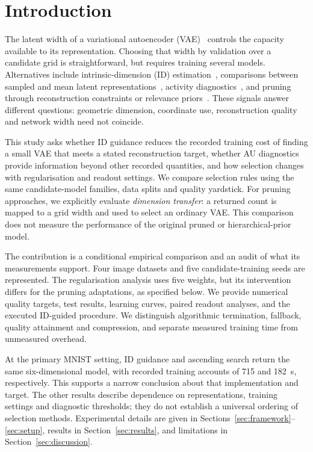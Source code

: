 \documentclass[make,article,submit,pdftex,moreauthors]{Definitions/mdpi}
\begin{document}
\section{Introduction}\label{sec:intro}

The latent width of a variational autoencoder (VAE)~\cite{kingma2014vae}
controls the capacity available to its representation. Choosing that width
by validation over a candidate grid is straightforward, but requires
training several models. Alternatives include intrinsic-dimension (ID)
estimation~\cite{facco2017twonn,levina2005mle}, comparisons between sampled
and mean latent representations~\cite{bonheme2022fondue}, activity
diagnostics~\cite{burda2016iwae,bonheme2023active}, and pruning through
reconstruction constraints or relevance priors~\cite{deboom2020geco,saha2025ardvae}.
These signals answer different questions: geometric dimension, coordinate
use, reconstruction quality and network width need not coincide.

This study asks whether ID guidance reduces the recorded training cost of
finding a small VAE that meets a stated reconstruction target, whether AU
diagnostics provide information beyond other recorded quantities, and how
selection changes with regularisation and readout settings. We compare
selection rules using the same candidate-model families, data splits and
quality yardstick. For pruning approaches, we explicitly evaluate
\emph{dimension transfer}: a returned count is mapped to a grid width and
used to select an ordinary VAE. This comparison does not measure the
performance of the original pruned or hierarchical-prior model.

The contribution is a conditional empirical comparison and an audit of
what its measurements support. Four image datasets and five
candidate-training seeds are represented. The regularisation analysis
uses five weights, but its intervention differs for the pruning
adaptations, as specified below. We provide numerical quality targets,
test results, learning curves, paired readout analyses, and the executed
ID-guided procedure. We distinguish algorithmic termination, fallback,
quality attainment and compression, and separate measured training time
from unmeasured overhead.

At the primary MNIST setting, ID guidance and ascending search return the
same six-dimensional model, with recorded training accounts of 715 and
182~s, respectively. This supports a narrow conclusion about that
implementation and target. The other results describe dependence on
representations, training settings and diagnostic thresholds; they do not
establish a universal ordering of selection methods. Experimental details
are given in Sections~\ref{sec:framework}--\ref{sec:setup}, results in
Section~\ref{sec:results}, and limitations in Section~\ref{sec:discussion}.
\end{document}
